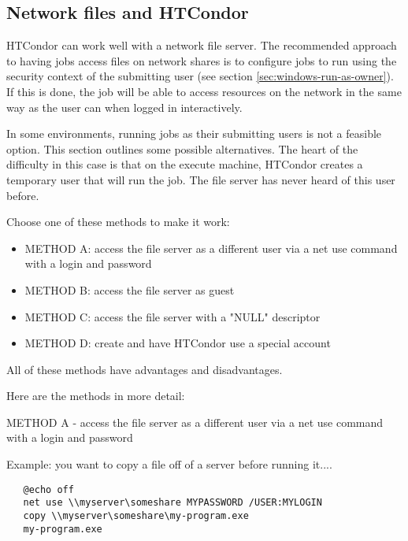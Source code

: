 \subsection{\label{sec:network-files-solutions}Network files and HTCondor}

HTCondor can work well with a network file server.  The recommended
approach to having jobs access files on network shares is to configure
jobs to run using the security context of the submitting user (see
section \ref{sec:windows-run-as-owner}).  If this is done, the job
will be able to access resources on the network in the same way as the
user can when logged in interactively.

In some environments, running jobs as their submitting users is not a
feasible option.  This section outlines some possible
alternatives. The heart of the difficulty in this case is that on the
execute machine, HTCondor creates a temporary user that will run the
job.  The file server has never heard of this user before.

Choose one of these methods to make it work:

\begin{itemize}
\item METHOD A: access the file server as a different user via a net use command
with a login and password
\item METHOD B: access the file server as guest
\item METHOD C: access the file server with a "NULL" descriptor
\item METHOD D: create and have HTCondor use a special account 
\end{itemize}

All of these methods have advantages and disadvantages.

Here are the methods in more detail:

METHOD A - access the file server as a different user via a net use command 
with a login and password

Example: you want to copy a file off of a server before running it....

\footnotesize
\begin{verbatim}
   @echo off
   net use \\myserver\someshare MYPASSWORD /USER:MYLOGIN
   copy \\myserver\someshare\my-program.exe
   my-program.exe
\end{verbatim}
\normalsize

